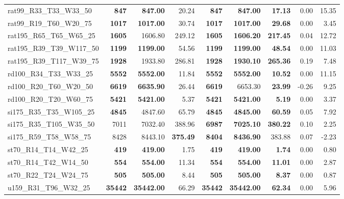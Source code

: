 \documentclass{singlecol-new}
\begin{document}
\begin{scriptsize}
\begin{longtable}{lrrrrrrrr}
		rat99\_R33\_T33\_W33\_50 & \textbf{847} & \textbf{847.00} & 20.24 & \textbf{847} & \textbf{847.00} & \textbf{17.13} & 0.00 & 15.35 \\
		rat99\_R19\_T60\_W20\_75 & \textbf{1017} & \textbf{1017.00} & 30.74 & \textbf{1017} & \textbf{1017.00} & \textbf{29.68} & 0.00 & 3.45 \\
		rat195\_R65\_T65\_W65\_25 & \textbf{1605} & 1606.80 & 249.12 & \textbf{1605} & \textbf{1606.20} & \textbf{217.45} & 0.04 & 12.72 \\
		rat195\_R39\_T39\_W117\_50 & \textbf{1199} & \textbf{1199.00} & 54.56 & \textbf{1199} & \textbf{1199.00} & \textbf{48.54} & 0.00 & 11.03 \\
		rat195\_R39\_T117\_W39\_75 & \textbf{1928} & 1933.80 & 286.81 & \textbf{1928} & \textbf{1930.10} & \textbf{265.36} & 0.19 & 7.48 \\
		rd100\_R34\_T33\_W33\_25 & \textbf{5552} & \textbf{5552.00} & 11.84 & \textbf{5552} & \textbf{5552.00} & \textbf{10.52} & 0.00 & 11.15 \\
		rd100\_R20\_T60\_W20\_50 & \textbf{6619} & \textbf{6635.90} & 26.44 & \textbf{6619} & 6653.30 & \textbf{23.99} & -0.26 & 9.25 \\
		rd100\_R20\_T20\_W60\_75 & \textbf{5421} & \textbf{5421.00} & 5.37 & \textbf{5421} & \textbf{5421.00} & \textbf{5.19} & 0.00 & 3.37 \\
		si175\_R35\_T35\_W105\_25 & \textbf{4845} & 4847.60 & 65.79 & \textbf{4845} & \textbf{4845.00} & \textbf{60.59} & 0.05 & 7.92 \\
		si175\_R35\_T105\_W35\_50 & 7011 & 7032.40 & 388.96 & \textbf{6987} & \textbf{7025.10} & \textbf{380.22} & 0.10 & 2.25 \\
		si175\_R59\_T58\_W58\_75 & 8428 & 8443.10 & \textbf{375.49} & \textbf{8404} & \textbf{8436.90} & 383.88 & 0.07 & -2.23 \\
		st70\_R14\_T14\_W42\_25 & \textbf{419} & \textbf{419.00} & 1.75 & \textbf{419} & \textbf{419.00} & \textbf{1.74} & 0.00 & 0.80 \\
		st70\_R14\_T42\_W14\_50 & \textbf{554} & \textbf{554.00} & 11.34 & \textbf{554} & \textbf{554.00} & \textbf{11.01} & 0.00 & 2.87 \\
		st70\_R22\_T24\_W24\_75 & \textbf{505} & \textbf{505.00} & 8.44 & \textbf{505} & \textbf{505.00} & \textbf{8.37} & 0.00 & 0.87 \\
		u159\_R31\_T96\_W32\_25 & \textbf{35442} & \textbf{35442.00} & 66.29 & \textbf{35442} & \textbf{35442.00} & \textbf{62.34} & 0.00 & 5.96 \\

\end{longtable}
\end{scriptsize}
\end{document}
